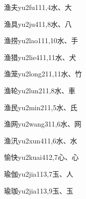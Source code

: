 \begin{entry}{渔夫}{yu2fu1}{11,4}{⽔、⼤}
\end{entry}

\begin{entry}{渔具}{yu2ju4}{11,8}{⽔、⼋}
\end{entry}

\begin{entry}{渔捞}{yu2lao1}{11,10}{⽔、⼿}
\end{entry}

\begin{entry}{渔猎}{yu2lie4}{11,11}{⽔、⽝}
\end{entry}

\begin{entry}{渔笼}{yu2long2}{11,11}{⽔、⽵}
\end{entry}

\begin{entry}{渔轮}{yu2lun2}{11,8}{⽔、⾞}
\end{entry}

\begin{entry}{渔民}{yu2min2}{11,5}{⽔、⽒}
\end{entry}

\begin{entry}{渔网}{yu2wang3}{11,6}{⽔、⽹}
\end{entry}

\begin{entry}{渔汛}{yu2xun4}{11,6}{⽔、⽔}
\end{entry}

\begin{entry}{愉快}{yu2kuai4}{12,7}{⼼、⼼}
\end{entry}

\begin{entry}{瑜伽}{yu2jia1}{13,7}{⽟、⼈}
\end{entry}

\begin{entry}{瑜珈}{yu2jia1}{13,9}{⽟、⽟}
\end{entry}


